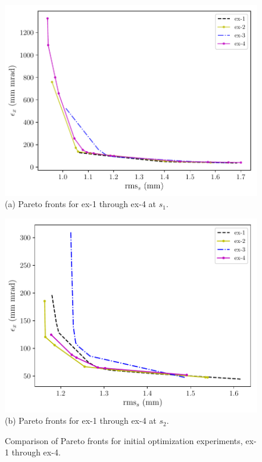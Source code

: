 \begin{figure}
	\centering
	\begin{minipage}{0.49\textwidth}
		\centering
		\includegraphics[width=\textwidth]{ex-pareto1-paperedit}
		(a) Pareto fronts for ex-1 through ex-4 at $s_1$.
	\end{minipage}
	\begin{minipage}{0.49\textwidth}
		\centering
		\includegraphics[width=\textwidth]{ex-pareto2-paperedit}
		(b) Pareto fronts for ex-1 through ex-4 at $s_2$.
	\end{minipage}
	\caption{Comparison of Pareto fronts for initial optimization experiments, ex-1 through ex-4.}
	\label{expareto}
\end{figure}

